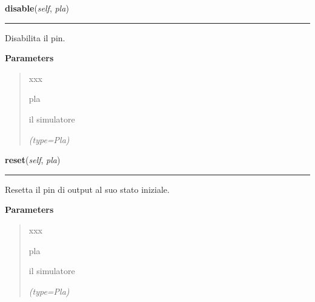     \label{component:OutPin:disable}

    \vspace{0.5ex}

\hspace{.8\funcindent}\begin{boxedminipage}{\funcwidth}

    \raggedright \textbf{disable}(\textit{self}, \textit{pla})

    \vspace{-1.5ex}

    \rule{\textwidth}{0.5\fboxrule}
\setlength{\parskip}{2ex}
    Disabilita il pin.

\setlength{\parskip}{1ex}
      \textbf{Parameters}
      \vspace{-1ex}

      \begin{quote}
        \begin{Ventry}{xxx}

          \item[pla]

          il simulatore

            {\it (type=Pla)}

        \end{Ventry}

      \end{quote}

    \end{boxedminipage}

    \label{component:OutPin:reset}

    \vspace{0.5ex}

\hspace{.8\funcindent}\begin{boxedminipage}{\funcwidth}

    \raggedright \textbf{reset}(\textit{self}, \textit{pla})

    \vspace{-1.5ex}

    \rule{\textwidth}{0.5\fboxrule}
\setlength{\parskip}{2ex}
    Resetta il pin di output al suo stato iniziale.

\setlength{\parskip}{1ex}
      \textbf{Parameters}
      \vspace{-1ex}

      \begin{quote}
        \begin{Ventry}{xxx}

          \item[pla]

          il simulatore

            {\it (type=Pla)}

        \end{Ventry}

      \end{quote}

    \end{boxedminipage}

